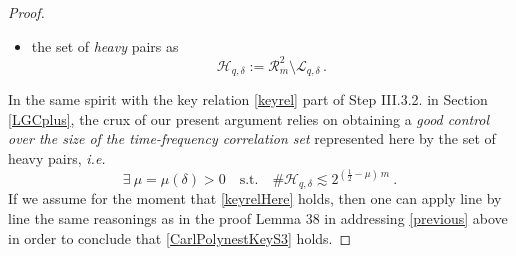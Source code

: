 \documentclass[a4paper,reqno]{amsart}
\numberwithin{equation}{section}
\theoremstyle{definition}
\def\beq{\begin{equation}}
\def\eeq{\end{equation}}
\def\beq{\begin{equation}}
\def\eeq{\end{equation}}
\def\r{\mathcal{R}}
\def\beq{\begin{equation}}
\def\eeq{\end{equation}}
\def\beq{\begin{equation}}
\def\eeq{\end{equation}}
\def\d{\delta}
\begin{document}
\begin{proof}
\begin{itemize}
\item  the set of \emph{heavy} pairs as
\begin{equation}\label{heavy}
\mathcal{H}_{q,\d}:= \r_m^2\setminus \mathcal{L}_{q,\d}\,.
\end{equation}
\end{itemize}
In the same spirit with the key relation \eqref{keyrel} part of Step III.3.2. in Section \ref{LGCplus}, the crux of our present argument relies on obtaining a \emph{good control over the size of the time-frequency correlation set} represented here by the set of heavy pairs, \emph{i.e.}
\beq\label{keyrelHere}
\boxed{\exists\:\mu=\mu(\d)>0\quad\textrm{s.t.}\quad\#\mathcal{H}_{q,\d}\lesssim 2^{(\frac{1}{2}-\mu)\,m}\:.}
\eeq
If we assume for the moment that \eqref{keyrelHere} holds, then one can apply line by line the same reasonings as in the proof Lemma 38 in \cite{Lie19} addressing \eqref{previous} above in order to conclude that \eqref{CarlPolynestKeyS3} holds.


\end{proof}
\end{document}
